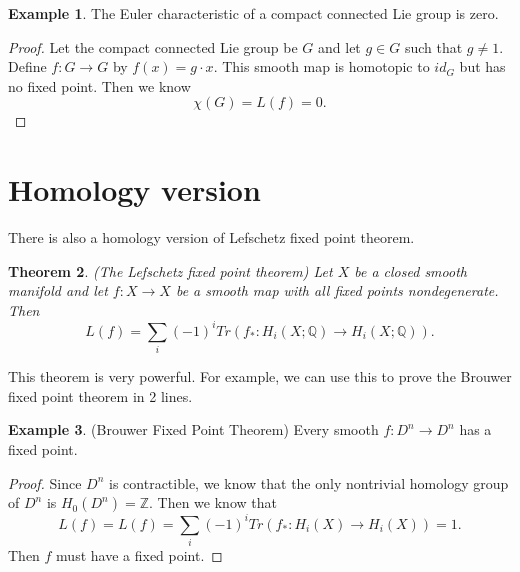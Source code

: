 \documentclass[psamsfonts]{amsart}
\newtheorem{theorem}{Theorem}[section]
\theoremstyle{definition}
\newtheorem{exmp}[theorem]{Example}
\theoremstyle{remark}
\numberwithin{equation}{section}
\begin{document}
		\begin{exmp}
			The Euler characteristic of a compact connected Lie group is zero.
		\end{exmp}
		\begin{proof}
			Let the compact connected Lie group be $G$ and let $g \in G$ such that $g \neq 1$. Define $f: G \to G$ by $f(x) = g \cdot x$. This smooth map is homotopic to $id_G$ but has no fixed point. Then we know
			\begin{equation}
				\chi (G) = L(f) = 0.
			\end{equation}
		\end{proof}
		
		\section{Homology version}
		There is also a homology version of Lefschetz fixed point theorem.
		\begin{theorem}(The Lefschetz fixed point theorem)
			Let $X$ be a closed smooth manifold and let $f: X \to X$ be a smooth map with all fixed points nondegenerate. Then
			\begin{equation}
				L(f) = \sum_{i} (-1)^i Tr(f_*: H_i(X;\mathbb{Q}) \to H_i(X;\mathbb{Q})).
			\end{equation}
		\end{theorem}
		This theorem is very powerful. For example, we can use this to prove the Brouwer fixed point theorem in 2 lines.
		\begin{exmp}(Brouwer Fixed Point Theorem)
			Every smooth $f: D^n \to D^n$ has a fixed point.
		\end{exmp}
		\begin{proof}
			Since $D^n$ is contractible, we know that the only nontrivial homology group of $D^n$ is $H_0(D^n) = \mathbb{Z}$. Then we know that 
			\begin{equation}
				L(f) = L(f) = \sum_{i} (-1)^i Tr(f_*: H_i(X) \to H_i(X)) = 1.
			\end{equation}
			Then $f$ must have a fixed point.
		\end{proof}
\end{document}
